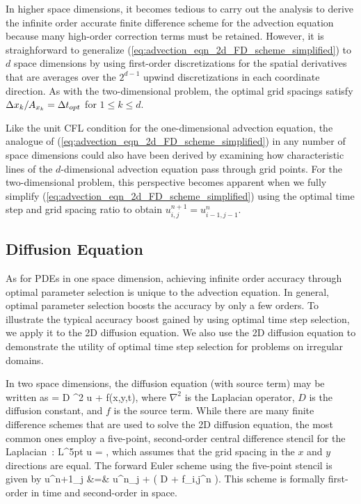 \documentclass[oneeqnum,onefignum,onetabnum,onethmnum]{siamltex}
\begin{document}
In higher space dimensions, it becomes tedious to carry out the analysis 
to derive the infinite order accurate finite difference scheme for the 
advection equation because many high-order correction terms must be retained.  
However, it is straighforward to generalize 
(\ref{eq:advection_eqn_2d_FD_scheme_simplified}) to $d$ space dimensions by 
using first-order discretizations for the spatial derivatives that are 
averages over the $2^{d-1}$ upwind discretizations in each coordinate 
direction.   As with the two-dimensional problem, the optimal grid spacings 
satisfy $\Delta x_k/A_{x_k} = \Delta t_{opt}$ for $1 \le k \le d$.

Like the unit CFL condition for the one-dimensional advection equation, the 
analogue of (\ref{eq:advection_eqn_2d_FD_scheme_simplified}) in any number
of space dimensions could also have been derived by examining how 
characteristic lines of the $d$-dimensional advection equation pass 
through grid points.  For the two-dimensional problem, this perspective 
becomes apparent when we fully simplify 
(\ref{eq:advection_eqn_2d_FD_scheme_simplified}) using the 
optimal time step and grid spacing ratio to obtain
$u^{n+1}_{i,j} = u^{n}_{i-1,j-1}$.



\subsection{Diffusion Equation}
As for PDEs in one space dimension, achieving infinite order accuracy 
through optimal parameter selection is unique to the advection equation.
In general, optimal parameter selection boosts the accuracy by only a few 
orders.  To illustrate the typical accuracy boost gained by using optimal 
time step selection, we apply it to the 2D diffusion equation.  We also 
use the 2D diffusion equation to demonstrate the utility of optimal time 
step selection for problems on irregular domains. 

In two space dimensions, the diffusion equation (with source term) may be 
written as
\beq
   = D \nabla^2 u + f(x,y,t),
  \label{eq:diffusion_eqn_2d}
\eeq
where $\nabla^2$ is the Laplacian operator, $D$ is the diffusion constant,
and $f$ is the source term.
While there are many finite difference schemes that are used to solve the 
2D diffusion equation, the most common ones employ a five-point, second-order 
central difference stencil for the Laplacian~\cite{iserles_book}:
\beq
  L^{5pt} u = ,
  \label{eq:laplacian_2d_5pt_stencil}
\eeq
which assumes that the grid spacing in the $x$ and $y$ directions are
equal.  The forward Euler scheme using the five-point stencil is given by
\bea
  u^{n+1}_j &=& u^{n}_j 
  + \dt 
    \left( D 
         + f_{i,j}^n
    \right).
  \label{eq:diffusion_eqn_2d_5pt_scheme}
\eea
This scheme is formally first-order in time and second-order in space.
\end{document}
